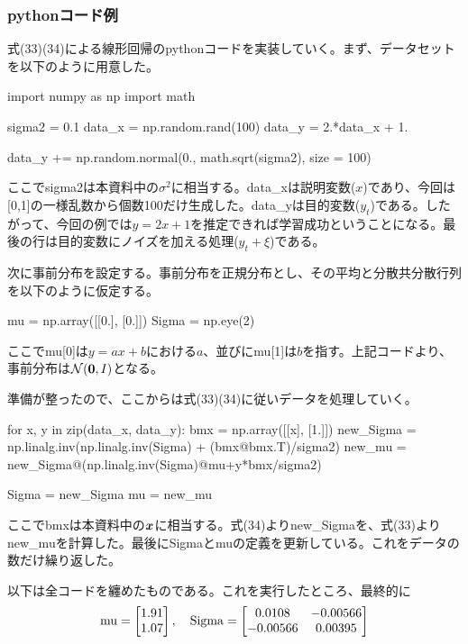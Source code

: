 \documentclass[dvipdfmx, 9pt, a4paper]{jsarticle}
\newcommand{\bm}[1]{{\mbox{\boldmath $#1$}}}
\begin{document}
\subsubsection{pythonコード例}
式(33)(34)による線形回帰のpythonコードを実装していく。まず、データセットを以下のように用意した。\bigskip
\begin{python}
import numpy as np
import math

sigma2 = 0.1
data_x = np.random.rand(100)
data_y = 2.*data_x + 1. 

data_y += np.random.normal(0., math.sqrt(sigma2), size = 100)
\end{python}\bigskip
ここでsigma2は本資料中の$\sigma^2$に相当する。data\_xは説明変数($x$)であり、今回は[0,1]の一様乱数から個数100だけ生成した。data\_yは目的変数($y_t$)である。したがって、今回の例では$y=2x+1$を推定できれば学習成功ということになる。最後の行は目的変数にノイズを加える処理($y_t+\xi$)である。\par
次に事前分布を設定する。事前分布を正規分布とし、その平均と分散共分散行列を以下のように仮定する。\bigskip
\begin{python}
mu = np.array([[0.], [0.]])
Sigma = np.eye(2)
\end{python}\bigskip
ここでmu[0]は$y=ax+b$における$a$、並びにmu[1]は$b$を指す。上記コードより、事前分布は$\mathcal{N}(\bm0, I)$となる。\par
準備が整ったので、ここからは式(33)(34)に従いデータを処理していく。\bigskip
\begin{python}
for x, y in zip(data_x, data_y):
	bmx = np.array([[x], [1.]])
	new_Sigma = np.linalg.inv(np.linalg.inv(Sigma) + (bmx@bmx.T)/sigma2)
	new_mu = new_Sigma@(np.linalg.inv(Sigma)@mu+y*bmx/sigma2)

	Sigma = new_Sigma
	mu = new_mu
\end{python}\bigskip
ここでbmxは本資料中の$\bm x$に相当する。式(34)よりnew\_Sigmaを、式(33)よりnew\_muを計算した。最後にSigmaとmuの定義を更新している。これをデータの数だけ繰り返した。\par
以下は全コードを纏めたものである。これを実行したところ、最終的に
\begin{equation}
{\rm mu}=
\begin{bmatrix}
1.91 \\ 1.07
\end{bmatrix},~~~
{\rm Sigma}=
\begin{bmatrix}
0.0108 & -0.00566 \\
-0.00566 & 0.00395
\end{bmatrix} \notag
\end{equation}
\end{document}
